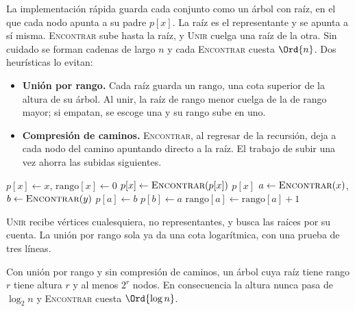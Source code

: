 \documentclass[11pt,letterpaper]{article}
\begin{document}
La implementación rápida guarda cada conjunto como un árbol con raíz,
en el que cada nodo apunta a su padre $p[x]$. La raíz es el
representante y se apunta a sí misma. \textsc{Encontrar} sube hasta la
raíz, y \textsc{Unir} cuelga una raíz de la otra. Sin cuidado se
forman cadenas de largo $n$ y cada \textsc{Encontrar} cuesta
$\Ord{n}$. Dos heurísticas lo evitan:

\begin{itemize}[itemsep=0.1em]
  \item \textbf{Unión por rango.} Cada raíz guarda un $\text{rango}$,
        una cota superior de la altura de su árbol. Al unir, la raíz
        de rango menor cuelga de la de rango mayor; si empatan, se
        escoge una y su rango sube en uno.
  \item \textbf{Compresión de caminos.} \textsc{Encontrar}, al
        regresar de la recursión, deja a cada nodo del camino
        apuntando directo a la raíz. El trabajo de subir una vez
        ahorra las subidas siguientes.
\end{itemize}

\begin{algorithm}[H]
\caption{Conjuntos disjuntos con unión por rango y compresión de
         caminos}
\label{alg:conjuntos-disjuntos}
\begin{algorithmic}[1]
  \State $p[x] \gets x$, \quad $\text{rango}[x] \gets 0$
\EndProcedure
{}
    \State $p[x] \gets \textsc{Encontrar}(p[x])$
  \EndIf
  \State \Return $p[x]$
\EndProcedure
{}
  \State $a \gets \textsc{Encontrar}(x)$, \quad
         $b \gets \textsc{Encontrar}(y)$
    \State $p[a] \gets b$ 
  \Else
    \State $p[b] \gets a$
      \State $\text{rango}[a] \gets \text{rango}[a] + 1$
    \EndIf
  \EndIf
\EndProcedure
\end{algorithmic}
\end{algorithm}

\textsc{Unir} recibe vértices cualesquiera, no representantes, y busca
las raíces por su cuenta. La unión por rango sola ya da una cota
logarítmica, con una prueba de tres líneas.

\begin{lema}
  \label{lem:rango-conjuntos}
  Con unión por rango y sin compresión de caminos, un árbol cuya raíz
  tiene rango $r$ tiene altura $r$ y al menos $2^r$ nodos. En
  consecuencia la altura nunca pasa de $\log_2 n$ y \textsc{Encontrar}
  cuesta $\Ord{\log n}$.
\end{lema}
\end{document}
